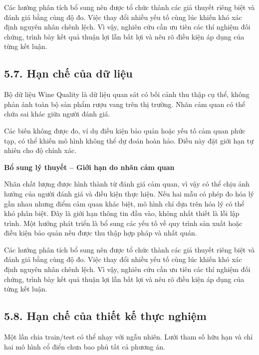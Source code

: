 \documentclass[12pt,a4paper,oneside]{article}
\begin{document}
Các hướng phân tích bổ sung nên được tổ chức thành các giả thuyết riêng biệt và đánh giá bằng cùng độ đo. Việc thay đổi nhiều yếu tố cùng lúc khiến khó xác định nguyên nhân chênh lệch. Vì vậy, nghiên cứu cần ưu tiên các thí nghiệm đối chứng, trình bày kết quả thuận lợi lẫn bất lợi và nêu rõ điều kiện áp dụng của từng kết luận.\par

\subsection*{5.7. Hạn chế của dữ liệu}

Bộ dữ liệu Wine Quality là dữ liệu quan sát có bối cảnh thu thập cụ thể,
không phản ánh toàn bộ sản phẩm rượu vang trên thị trường. Nhãn cảm quan
có thể chứa sai khác giữa người đánh giá.

Các biến không được đo, ví dụ điều kiện bảo quản hoặc yếu tố cảm quan
phức tạp, có thể khiến mô hình không thể dự đoán hoàn hảo. Điều này đặt
giới hạn tự nhiên cho độ chính xác.


\par\noindent\textbf{Bổ sung lý thuyết -- Giới hạn do nhãn cảm quan}\par
Nhãn chất lượng được hình thành từ đánh giá cảm quan, vì vậy có thể chịu ảnh hưởng của người đánh giá và điều kiện thực hiện. Nếu hai mẫu có phép đo hóa lý gần nhau nhưng điểm cảm quan khác biệt, mô hình chỉ dựa trên hóa lý có thể khó phân biệt. Đây là giới hạn thông tin đầu vào, không nhất thiết là lỗi lập trình. Một hướng phát triển là bổ sung các yếu tố về quy trình sản xuất hoặc điều kiện bảo quản nếu được thu thập hợp pháp và nhất quán.\par

Các hướng phân tích bổ sung nên được tổ chức thành các giả thuyết riêng biệt và đánh giá bằng cùng độ đo. Việc thay đổi nhiều yếu tố cùng lúc khiến khó xác định nguyên nhân chênh lệch. Vì vậy, nghiên cứu cần ưu tiên các thí nghiệm đối chứng, trình bày kết quả thuận lợi lẫn bất lợi và nêu rõ điều kiện áp dụng của từng kết luận.\par

\subsection*{5.8. Hạn chế của thiết kế thực nghiệm}

Một lần chia train/test có thể nhạy với ngẫu nhiên. Lưới tham số hữu hạn
và chỉ hai mô hình cổ điển chưa bao phủ tất cả phương án.
\end{document}
